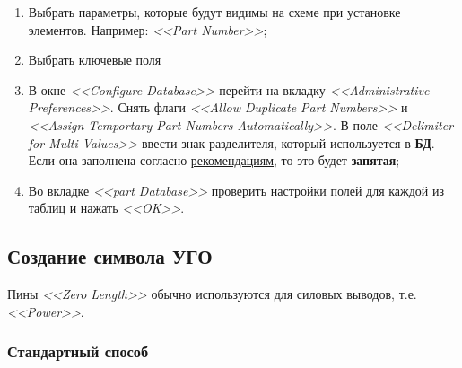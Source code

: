 \begin{enumerate}
		\begin{figure}[H]
		\end{figure}
	\item Выбрать параметры, которые будут видимы на схеме при установке элементов. Например: \textit{<<Part Number>>};
		\begin{figure}[H]
		\end{figure}
	\item Выбрать ключевые поля
		\begin{figure}[H]
		\end{figure}	
	\item В окне \textit{<<Configure Database>>} перейти на вкладку \textit{<<Administrative Preferences>>}. Снять флаги \textit{<<Allow Duplicate Part Numbers>>} и \textit{<<Assign Temportary Part Numbers Automatically>>}. В поле \textit{<<Delimiter for Multi-Values>>} ввести знак разделителя, который используется в \textbf{БД}. Если она заполнена согласно \hyperlink{sssec:bd_contet}{рекомендациям}, то это будет \textbf{запятая};
		\begin{figure}[H]
		\end{figure}
	\item Во вкладке \textit{<<part Database>>} проверить настройки полей для каждой из таблиц и нажать \textit{<<OK>>}.
		\begin{figure}[H]
		\end{figure}
	
\end{enumerate}



\newpage
\subsection{Создание символа УГО} \label{ssec:create_symbol}

Пины \textit{<<Zero Length>>} обычно используются для силовых выводов, т.е. \textit{<<Power>>}.

\subsubsection{Стандартный способ} \label{sssec:create_symbol_standart}

